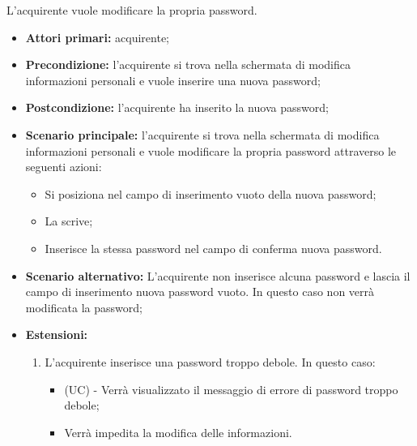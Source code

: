 L'acquirente vuole modificare la propria password.
\begin{itemize}
    \item \textbf{Attori primari:} acquirente;
    \item \textbf{Precondizione:} l'acquirente si trova nella schermata di modifica informazioni personali e vuole inserire una nuova password;
    \item \textbf{Postcondizione:} l'acquirente ha inserito la nuova password;
    \item \textbf{Scenario principale:} l'acquirente si trova nella schermata di modifica informazioni personali e vuole modificare la propria password attraverso le seguenti azioni:
    \begin{itemize}
        \item Si posiziona nel campo di inserimento vuoto della nuova password;
        \item La scrive;
        \item Inserisce la stessa password nel campo di conferma nuova password.
    \end{itemize}
    \item \textbf{Scenario alternativo:} L'acquirente non inserisce alcuna password e lascia il campo di inserimento nuova password vuoto. In questo caso non verrà modificata la password;
    \item \textbf{Estensioni:}
    \begin{enumerate}[label=\lett]
        \item L'acquirente inserisce una password troppo debole. In questo caso:
        \begin{itemize}
            \item (UC) - Verrà visualizzato il messaggio di errore di password troppo debole;
            \item Verrà impedita la modifica delle informazioni.
        \end{itemize}
    \end{enumerate}
\end{itemize}

